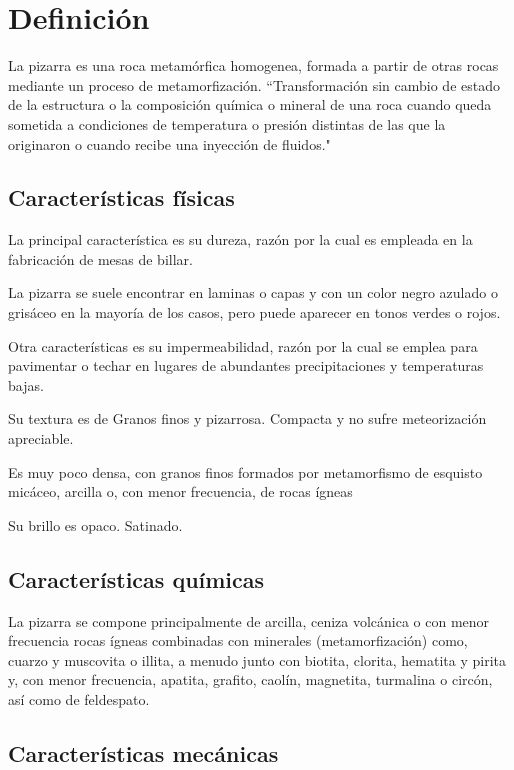 \section {Definición}

	La pizarra es una roca metamórfica homogenea, formada a partir de otras rocas mediante un proceso de metamorfización. ``Transformación sin cambio de estado de la estructura o la composición química o mineral de una roca cuando queda sometida a condiciones de temperatura o presión distintas de las que la originaron o cuando recibe una inyección de fluidos."

	\subsection {Características físicas}
	La principal característica es su dureza, razón por la cual es empleada en la fabricación de mesas de billar.

	La pizarra se suele encontrar en laminas o capas y con  un color negro azulado o grisáceo en la mayoría de los casos, pero puede aparecer en tonos  verdes o rojos.

	Otra características es su impermeabilidad, razón por la cual se emplea para pavimentar o techar en lugares de abundantes precipitaciones y temperaturas bajas. 

Su textura es de Granos finos y pizarrosa. Compacta y no sufre meteorización apreciable.

Es muy poco densa, con granos finos formados por metamorfismo de esquisto micáceo, arcilla o, con menor frecuencia, de rocas ígneas

Su brillo es opaco. Satinado.

	\subsection {Características químicas}

La pizarra se compone principalmente de arcilla, ceniza volcánica o con menor frecuencia rocas ígneas combinadas con minerales (metamorfización) como, cuarzo y muscovita o illita, a menudo junto con biotita, clorita, hematita y pirita y, con menor frecuencia, apatita, grafito, caolín, magnetita, turmalina o circón, así como de feldespato.

	\subsection {Características mecánicas}
 
